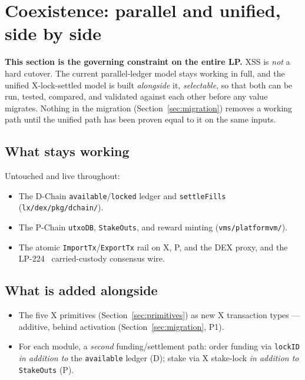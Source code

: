 \section{Coexistence: parallel and unified, side by side}
\label{sec:coexistence}

\textbf{This section is the governing constraint on the entire LP.} XSS
is \emph{not} a hard cutover. The current parallel-ledger model stays
working in full, and the unified X-lock-settled model is built
\emph{alongside} it, \emph{selectable}, so that both can be run, tested,
compared, and validated against each other before any value migrates.
Nothing in the migration (Section~\ref{sec:migration}) removes a working
path until the unified path has been proven equal to it on the same
inputs.

\subsection{What stays working}

Untouched and live throughout:

\begin{itemize}[leftmargin=2em,nosep]
\item The D-Chain \texttt{available}/\texttt{locked} ledger and
  \texttt{settleFills} (\texttt{lx/dex/pkg/dchain/}).
\item The P-Chain \texttt{utxoDB}, \texttt{StakeOuts}, and reward
  minting (\texttt{vms/platformvm/}).
\item The atomic \texttt{ImportTx}/\texttt{ExportTx} rail on X, P, and
  the DEX proxy, and the LP-224~\cite{lp224} carried-custody
  consensus wire.
\end{itemize}

\subsection{What is added alongside}

\begin{itemize}[leftmargin=2em,nosep]
\item The five X primitives (Section~\ref{sec:primitives}) as new X
  transaction types --- additive, behind activation
  (Section~\ref{sec:migration}, P1).
\item For each module, a \emph{second} funding/settlement path: order
  funding via \texttt{lockID} \emph{in addition to} the
  \texttt{available} ledger (D); stake via X stake-lock \emph{in
  addition to} \texttt{StakeOuts} (P).
\end{itemize}

